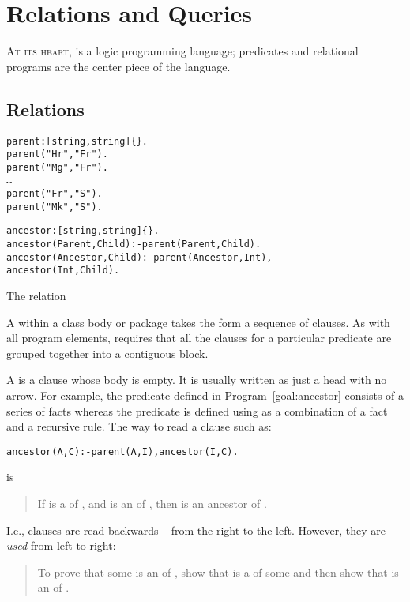 \chapter{Relations and Queries}
\label{goals}
\lettrine[findent=-0.2em,nindent=0.3em]{A}{t its heart,} \go is a logic programming language; predicates and relational programs are the center piece of the language.

\section{Relations}
\label{relations}

\begin{program}[bt]
\vspace{0.5ex}
\begin{alltt}
parent:[string,string]\{\}.
parent("Hr","Fr").
parent("Mg","Fr").
\ldots
parent("Fr","S").
parent("Mk","S").

ancestor:[string,string]\{\}.
ancestor(Parent,Child) :- parent(Parent,Child).
ancestor(Ancestor,Child) :- parent(Ancestor,Int),
  ancestor(Int,Child).
\end{alltt}
\vspace{-2ex}
\caption{The  relation\label{goal:ancestor}}
\end{program}

A  within a class body or package takes the form a sequence of clauses. As with all program elements, \go requires that all the clauses for a particular predicate are grouped together into a contiguous block.

A  is a clause whose body is empty. It is usually written as just a head with no arrow. For example, the  predicate defined in Program~\ref{goal:ancestor} consists of a series of facts whereas the  predicate
is defined using as a combination of a fact and a recursive rule. The way to read a clause such as:
\begin{alltt}
ancestor(A,C) :- parent(A,I), ancestor(I,C).
\end{alltt}
is
\begin{quote}
If  is a  of , and  is an  of , then  is an ancestor of .
\end{quote}
I.e., clauses are read backwards -- from the right to the left. However, they are \emph{used} from left to right:
\begin{quote}
To prove that some  is an  of , show that  is a  of some  and then show that  is an  of .
\end{quote}

